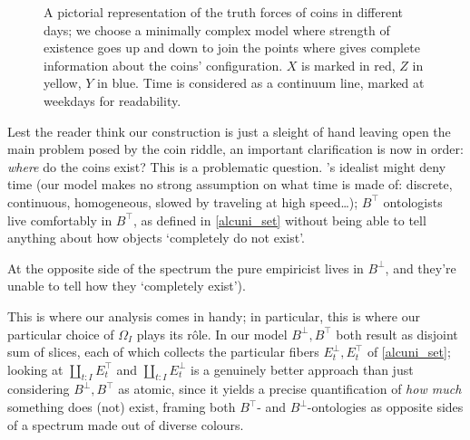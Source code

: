 \begin{example}
\begin{center}
\begin{figure}[h]
      \caption{A pictorial representation of the truth forces of coins in different days; we choose a minimally complex model where strength of existence goes up and down to join the points where \cite{tlonEN} gives complete information about the coins' configuration. $X$ is marked in red, $Z$ in yellow, $Y$ in blue. Time is considered as a continuum line, marked at weekdays for readability.}
      \label{fig_coins}
    \end{figure}
  \end{center}
\end{example}
\begin{remark}
  Lest the reader think our construction is just a sleight of hand leaving open the main problem posed by the coin riddle, an important clarification is now in order: \emph{where} do the coins exist? This is a problematic question. \tlon's idealist might deny time (our model makes no strong assumption on what time is made of: discrete, continuous, homogeneous, slowed by traveling at high speed\dots); $B^\top$ ontologists live comfortably in $B^\top$, as defined in \autoref{alcuni_set} without being able to tell anything about how objects `completely do not exist'.

  At the opposite side of the spectrum the pure empiricist lives in $B^\bot$, and they're unable to tell how they `completely exist').

  This is where our analysis comes in handy; in particular, this is where our particular choice of $\Omega_I$ plays its r\^ole. In our model $B^\perp, B^\top$ both result as disjoint sum of slices, each of which collects the particular fibers $E_t^\perp, E_t^\top$ of \ref{alcuni_set}; looking at $ \coprod_{t : I} E_t^\top$ and $ \coprod_{t : I} E_t^\bot$ is a genuinely better approach than just considering $B^\perp, B^\top$ as atomic, since it yields a precise quantification of \emph{how much} something does (not) exist, framing both $B^\top$- and $B^\bot$-ontologies as opposite sides of a spectrum made out of diverse colours.
\end{remark}
